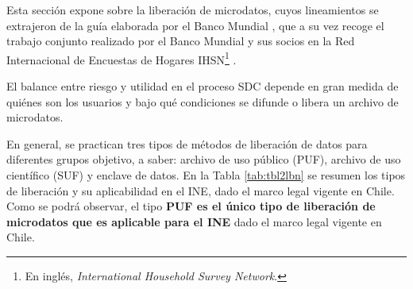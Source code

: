 \documentclass[
]{book}
\theoremstyle{definition}
\theoremstyle{definition}
\theoremstyle{definition}
\theoremstyle{definition}
\theoremstyle{remark}
\begin{document}
Esta sección expone sobre la liberación de microdatos, cuyos lineamientos se extrajeron de la guía elaborada por el Banco Mundial \citep{benschop2021}, que a su vez recoge el trabajo conjunto realizado por el Banco Mundial y sus socios en la Red Internacional de Encuestas de Hogares IHSN\footnote{En inglés, \emph{International Household Survey Network}.} \citep{dupriez2010}.

El balance entre riesgo y utilidad en el proceso SDC depende en gran medida de quiénes son los usuarios y bajo qué condiciones se difunde o libera un archivo de microdatos.

En general, se practican tres tipos de métodos de liberación de datos para diferentes grupos objetivo, a saber: archivo de uso público (PUF), archivo de uso científico (SUF) y enclave de datos. En la Tabla \ref{tab:tbl2lbn} se resumen los tipos de liberación y su aplicabilidad en el INE, dado el marco legal vigente en Chile. Como se podrá observar, el tipo \textbf{PUF es el único tipo de liberación de microdatos que es aplicable para el INE} dado el marco legal vigente en Chile.
\end{document}
